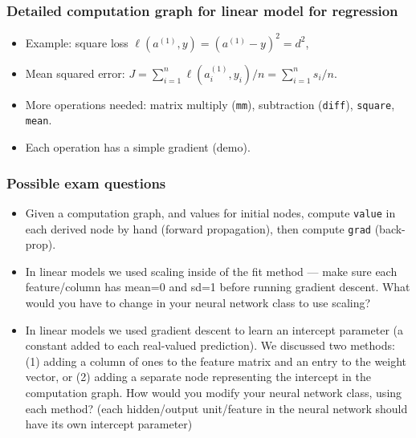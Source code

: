 \documentclass{beamer}
\begin{document}
\begin{frame}
  \frametitle{Detailed computation graph for linear model for regression}
  \begin{itemize}
  \item Example: square loss $\ell(a^{(1)}, y) = (a^{(1)}-y)^2 = d^2$,
  \item Mean squared error: $J = \sum_{i=1}^n \ell(a_i^{(1)}, y_i)/n=\sum_{i=1}^n s_i/n$.
  \item More operations needed: matrix multiply (\texttt{mm}),
    subtraction (\texttt{diff}), \texttt{square}, \texttt{mean}.
  \item Each operation has a simple gradient (demo).
  \end{itemize}


\end{frame}

\begin{frame}
  \frametitle{Possible exam questions}
  \begin{itemize}
  \item Given a computation graph, and values for initial nodes,
    compute \texttt{value} in each derived node by hand (forward
    propagation), then compute \texttt{grad} (back-prop).
  \item In linear models we used scaling inside of the fit method ---
    make sure each feature/column has mean=0 and sd=1 before running
    gradient descent. What would you have to change in your neural
    network class to use scaling?
  \item In linear models we used gradient descent to learn an
    intercept parameter (a constant added to each real-valued
    prediction). We discussed two methods: (1) adding a column of ones
    to the feature matrix and an entry to the weight vector, or (2)
    adding a separate node representing the intercept in the
    computation graph. How would you modify your neural network class,
    using each method? (each hidden/output unit/feature in the neural
    network should have its own intercept parameter)
  \end{itemize}
\end{frame}
\end{document}
